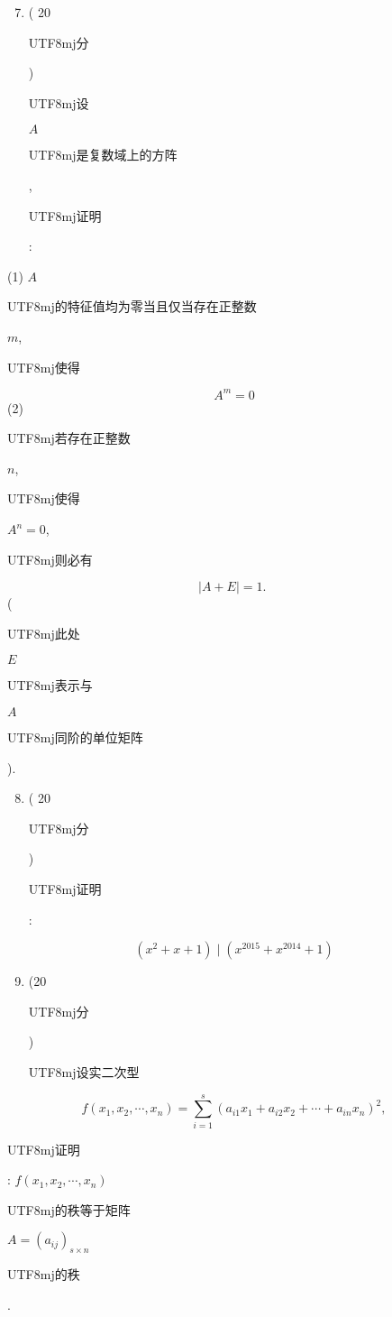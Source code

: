 \documentclass[10pt]{article}
\begin{document}
\begin{enumerate}
  \setcounter{enumi}{6}
  \item ( 20 \begin{CJK}{UTF8}{mj}分\end{CJK}) \begin{CJK}{UTF8}{mj}设\end{CJK} $A$ \begin{CJK}{UTF8}{mj}是复数域上的方阵\end{CJK}, \begin{CJK}{UTF8}{mj}证明\end{CJK}:
\end{enumerate}
(1) $A$ \begin{CJK}{UTF8}{mj}的特征值均为零当且仅当存在正整数\end{CJK} $m$, \begin{CJK}{UTF8}{mj}使得\end{CJK}
$$
A^{m}=0
$$
(2) \begin{CJK}{UTF8}{mj}若存在正整数\end{CJK} $n$, \begin{CJK}{UTF8}{mj}使得\end{CJK} $A^{n}=0$, \begin{CJK}{UTF8}{mj}则必有\end{CJK}
$$
|A+E|=1 \text {. }
$$
(\begin{CJK}{UTF8}{mj}此处\end{CJK} $E$ \begin{CJK}{UTF8}{mj}表示与\end{CJK} $A$ \begin{CJK}{UTF8}{mj}同阶的单位矩阵\end{CJK}).

\begin{enumerate}
  \setcounter{enumi}{7}
  \item ( 20 \begin{CJK}{UTF8}{mj}分\end{CJK}) \begin{CJK}{UTF8}{mj}证明\end{CJK}:
\end{enumerate}
$$
\left(x^{2}+x+1\right) \mid\left(x^{2015}+x^{2014}+1\right)
$$

\begin{enumerate}
  \setcounter{enumi}{8}
  \item (20 \begin{CJK}{UTF8}{mj}分\end{CJK}) \begin{CJK}{UTF8}{mj}设实二次型\end{CJK}
\end{enumerate}
$$
f\left(x_{1}, x_{2}, \cdots, x_{n}\right)=\sum_{i=1}^{s}\left(a_{i 1} x_{1}+a_{i 2} x_{2}+\cdots+a_{i n} x_{n}\right)^{2},
$$
\begin{CJK}{UTF8}{mj}证明\end{CJK}: $f\left(x_{1}, x_{2}, \cdots, x_{n}\right)$ \begin{CJK}{UTF8}{mj}的秩等于矩阵\end{CJK} $A=\left(a_{i j}\right)_{s \times n}$ \begin{CJK}{UTF8}{mj}的秩\end{CJK}.
\end{document}
